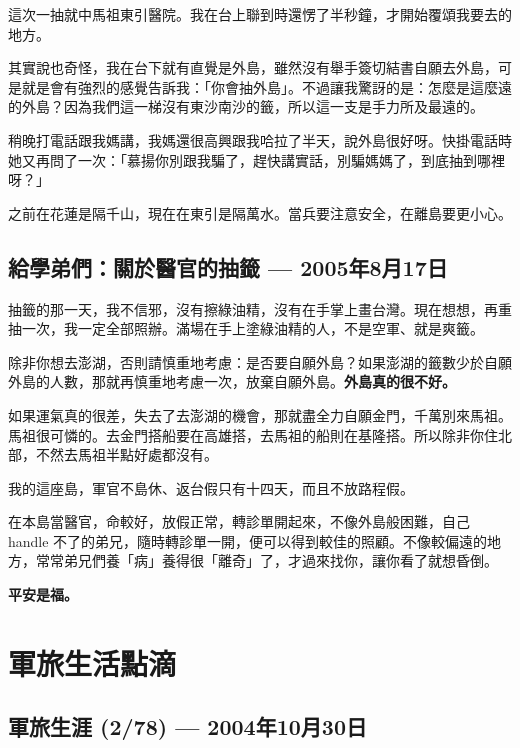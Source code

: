\documentclass[12pt,a4paper]{article}
\newenvironment{myquote}{%
    \begin{tcolorbox}[
        colback=quote_bg,
        colframe=emergency_gray,
        boxrule=0pt,
        leftrule=3pt,
        arc=0pt,
        left=10pt,
        right=10pt,
        top=8pt,
        bottom=8pt
    ]
    \itshape
}{%
    \end{tcolorbox}
}
\begin{document}
這次一抽就中馬祖東引醫院。我在台上聯到時還愣了半秒鐘，才開始覆頌我要去的地方。

其實說也奇怪，我在台下就有直覺是外島，雖然沒有舉手簽切結書自願去外島，可是就是會有強烈的感覺告訴我：「你會抽外島」。不過讓我驚訝的是：怎麼是這麼遠的外島？因為我們這一梯沒有東沙南沙的籤，所以這一支是手力所及最遠的。

稍晚打電話跟我媽講，我媽還很高興跟我哈拉了半天，說外島很好呀。快掛電話時她又再問了一次：「慕揚你別跟我騙了，趕快講實話，別騙媽媽了，到底抽到哪裡呀？」

\begin{myquote}
之前在花蓮是隔千山，現在在東引是隔萬水。當兵要注意安全，在離島要更小心。
\end{myquote}

\subsection{給學弟們：關於醫官的抽籤 — 2005年8月17日}

抽籤的那一天，我不信邪，沒有擦綠油精，沒有在手掌上畫台灣。現在想想，再重抽一次，我一定全部照辦。滿場在手上塗綠油精的人，不是空軍、就是爽籤。

除非你想去澎湖，否則請慎重地考慮：是否要自願外島？如果澎湖的籤數少於自願外島的人數，那就再慎重地考慮一次，放棄自願外島。\textbf{外島真的很不好。}

如果運氣真的很差，失去了去澎湖的機會，那就盡全力自願金門，千萬別來馬祖。馬祖很可憐的。去金門搭船要在高雄搭，去馬祖的船則在基隆搭。所以除非你住北部，不然去馬祖半點好處都沒有。

我的這座島，軍官不島休、返台假只有十四天，而且不放路程假。

在本島當醫官，命較好，放假正常，轉診單開起來，不像外島般困難，自己 handle 不了的弟兄，隨時轉診單一開，便可以得到較佳的照顧。不像較偏遠的地方，常常弟兄們養「病」養得很「離奇」了，才過來找你，讓你看了就想昏倒。

\begin{myquote}
\textbf{平安是福。}
\end{myquote}

\section{軍旅生活點滴}

\subsection{軍旅生涯 (2/78) — 2004年10月30日}
\end{document}
